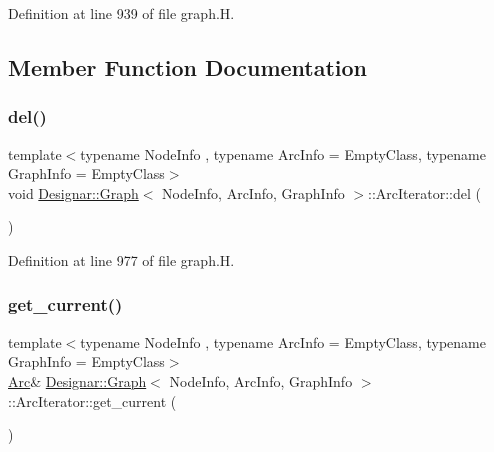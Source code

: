Definition at line 939 of file graph.\+H.



\subsection{Member Function Documentation}
\mbox{\label{class_designar_1_1_graph_1_1_arc_iterator_a6375bb0513856b2b20dffbfb2496082e}} 
\subsubsection{\texorpdfstring{del()}{del()}}
{\footnotesize\ttfamily template$<$typename Node\+Info , typename Arc\+Info  = Empty\+Class, typename Graph\+Info  = Empty\+Class$>$ \\
void \hyperlink{class_designar_1_1_graph}{Designar\+::\+Graph}$<$ Node\+Info, Arc\+Info, Graph\+Info $>$\+::Arc\+Iterator\+::del (\begin{DoxyParamCaption}{ }\end{DoxyParamCaption})\hspace{0.3cm}{\ttfamily [inline]}}



Definition at line 977 of file graph.\+H.

\mbox{\label{class_designar_1_1_graph_1_1_arc_iterator_a4915ccaef38293e9dc449e7dba3965ec}} 
\subsubsection{\texorpdfstring{get\+\_\+current()}{get\_current()}\hspace{0.1cm}{\footnotesize\ttfamily [1/2]}}
{\footnotesize\ttfamily template$<$typename Node\+Info , typename Arc\+Info  = Empty\+Class, typename Graph\+Info  = Empty\+Class$>$ \\
\hyperlink{class_designar_1_1_graph_a74c730ef4ce2d20f998d72bd25c2b5bf}{Arc}\& \hyperlink{class_designar_1_1_graph}{Designar\+::\+Graph}$<$ Node\+Info, Arc\+Info, Graph\+Info $>$\+::Arc\+Iterator\+::get\+\_\+current (\begin{DoxyParamCaption}{ }\end{DoxyParamCaption})\hspace{0.3cm}{\ttfamily [inline]}}



